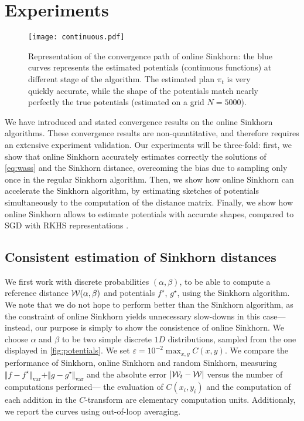 \section{Experiments}\label{sec:exps}

\begin{figure*}[t]
    \centering
    \texttt{[image: continuous.pdf]}
    \caption{Representation of the convergence path of online Sinkhorn: the blue curves represents the estimated potentials (continuous functions) at different stage of the algorithm. The estimated plan $\pi_t$ is very quickly accurate, while the shape of the potentials match nearly perfectly the true potentials (estimated on a grid $N = 5000$).}
    \label{fig:potentials}
\end{figure*}


We have introduced and stated convergence results on the online Sinkhorn
algorithms. These convergence results are non-quantitative, and therefore
requires an extensive experiment validation. Our experiments will be three-fold:
first, we show that online Sinkhorn accurately estimates correctly the solutions
of \eqref{eq:wass} and the Sinkhorn distance, overcoming the bias due to
sampling only once in the regular Sinkhorn algorithm. Then, we show
how online Sinkhorn can accelerate the Sinkhorn algorithm, by estimating sketches
of potentials simultaneously to the computation of the distance matrix. Finally, we show
how online Sinkhorn allows to estimate potentials with accurate shapes, compared
to SGD with RKHS representations \citep{2016-genevay-nips}.

\subsection{Consistent estimation of Sinkhorn distances}

We first work with discrete probabilities $(\alpha, \beta)$, to be able to compute a reference
distance $\mathcal{W}(\alpha, \beta)$ and potentials $f^\star$, $g^\star$, using the Sinkhorn
algorithm. We note that we do not hope to perform better than the Sinkhorn
algorithm, as the constraint of online Sinkhorn yields unnecessary slow-downs in
this case---instead, our purpose is simply to show the consistence of online
Sinkhorn. We choose $\alpha$ and $\beta$ to be two simple discrete $1D$
distributions, sampled from the one displayed in \autoref{fig:potentials}. We set
$\varepsilon = 10^{-2} \max_{x,y} C(x,y)$. We
compare the performance of Sinkhorn, online Sinkhorn and random Sinkhorn,
measuring $\Vert f - f^\star \Vert_{\text{var}} + \Vert g - g^\star
\Vert_{\text{var}}$ and the absolute error $| \mathcal{W}_t - \mathcal{W} |$ versus the number
of computations performed--- the evaluation of $C(x_i, y_i)$ and the computation
of each addition in the $C$-transform are elementary computation units.
Additionaly, we report the curves using out-of-loop averaging. 

